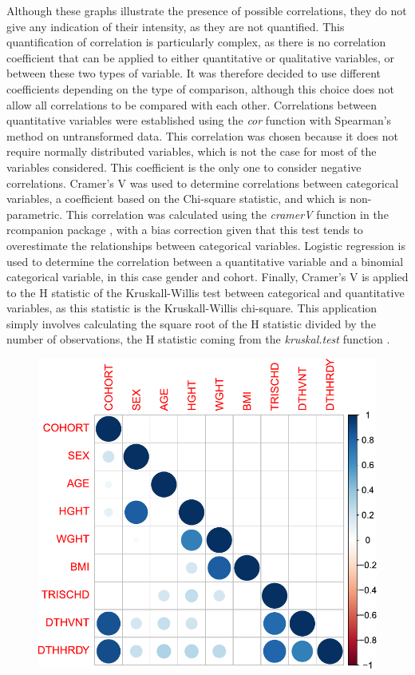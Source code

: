 \documentclass[a4paper, 11pt]{article}
\begin{document}
\begin{multicols}{2}
Although these graphs illustrate the presence of possible correlations, they do not give any indication of their intensity, as they are not quantified. 
This quantification of correlation is particularly complex, as there is no correlation coefficient that can be applied to either quantitative or qualitative variables, or between these two types of variable. 
It was therefore decided to use different coefficients depending on the type of comparison, although this choice does not allow all correlations to be compared with each other. 
Correlations between quantitative variables were established using the \textit{cor}  function with Spearman's method \citep{R:2024} on untransformed data. 
This correlation was chosen because it does not require normally distributed variables, which is not the case for most of the variables considered. 
This coefficient is the only one to consider negative correlations.
Cramer's V was used to determine correlations between categorical variables, a coefficient based on the Chi-square statistic, and which is non-parametric. 
This correlation was calculated using the \textit{cramerV} function in the rcompanion package \citep{rcomp}, with a bias correction given that this test tends to overestimate the relationships between categorical variables.
Logistic regression is used to determine the correlation between a quantitative variable and a binomial categorical variable, in this case gender and cohort. 
Finally, Cramer's V is applied to the H statistic of the Kruskall-Willis test between categorical and quantitative variables, as this statistic is the Kruskall-Willis chi-square. This application simply involves calculating the square root of the H statistic divided by the number of observations, the H statistic coming from the \textit{kruskal.test} function \citep{R:2024}.
\begin{figure}[H]
	\centering
	\includegraphics[width=\columnwidth]{figures/clinical_correlation_plots/corrected_allCorrelations2}

\end{figure}
\end{multicols}
\end{document}
